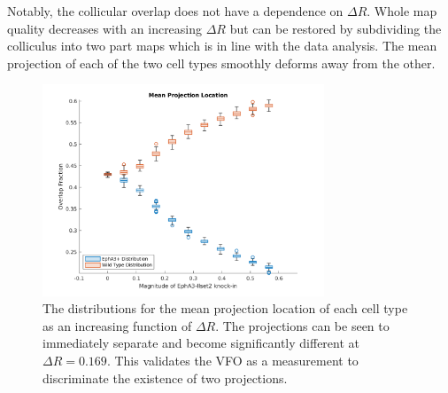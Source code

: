 Notably, the collicular overlap does not have a dependence on $\Delta R$. Whole map quality decreases with an increasing $\Delta R$ but can be restored by subdividing the colliculus into two part maps which is in line with the data analysis. The mean projection of each of the two cell types smoothly deforms away from the other.
\begin{figure}
	\centering
	\includegraphics[width=0.75\textwidth]{images/lattice/stats_mean_projection}
	\def\c{The distributions for the mean projection location of each cell type as an increasing function of $\Delta R$.  }
	\caption[\c]{\c The projections can be seen to immediately separate and become significantly different at $\Delta R=0.169$. This validates the VFO as a measurement to discriminate the existence of two projections. \label{fig:meanprojectionstats} }
\end{figure}

